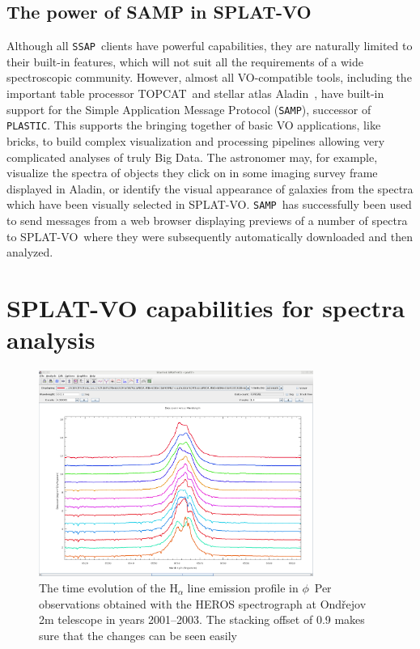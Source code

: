 \documentclass[final,authoryear,5p,times,twocolumn]{elsarticle}
\newcommand{\ssap}{\texttt{SSAP}}
\newcommand{\plastic}{\texttt{PLASTIC}}
\newcommand{\samp}{\texttt{SAMP}}
\newcommand{\splatvo}{{\textsf{\small{SPLAT-VO}}}}
\newcommand{\topcat}{\textsf{\small TOPCAT}}
\newcommand{\aladin}{\textsf{\small Aladin}}
\newcommand{\ascl}[1]{\href{http://www.ascl.net/#1}{ascl:#1}}
\begin{document}

\subsection{The power of SAMP in SPLAT-VO}

Although all \ssap\ clients have powerful capabilities, they are naturally
limited to their built-in features, which will not suit all the requirements
of a wide spectroscopic community. However, almost all VO-compatible tools,
including the important table processor \topcat\ and stellar atlas \aladin\
\citep[][\ascl{1112.019}]{2005ASPC..347..193O}, have built-in support for the Simple Application Message
Protocol (\samp), successor of \plastic. This supports the bringing together of
basic VO applications, like bricks, to build complex visualization and
processing pipelines allowing very complicated analyses of truly Big Data.
The astronomer may, for example, visualize the spectra of objects they click
on in some imaging survey frame displayed in \aladin, or identify the visual
appearance of galaxies from the spectra which have been visually selected in
\splatvo. \samp\ has successfully been used to send messages from a web browser
displaying previews of a number of spectra to \splatvo\ where they were
subsequently automatically downloaded and then analyzed.

\section{SPLAT-VO capabilities  for spectra analysis}

\begin{figure}[t]
\begin{center}
\includegraphics[width=0.8\textwidth]{phiper-heros-stack.pdf}
\caption{The time evolution of the H$_\alpha$ line emission profile in
$\phi$~Per observations obtained with the HEROS spectrograph at Ond\v{r}ejov 2m
telescope in years 2001--2003. The stacking offset of 0.9  makes sure that the changes can be seen easily}

\label{fig:phiper-heros-stack}
\end{center}
\end{figure}
\end{document}
